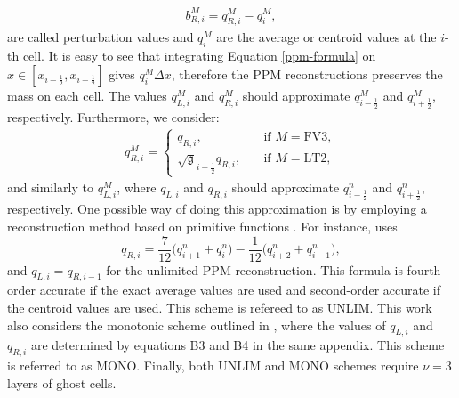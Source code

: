 \documentclass[preprint,12pt]{elsarticle}
\begin{document}
\begin{linenumbers}
\begin{align}
	b_{R,i}^M = q_{R,i}^M-{q_i^M},
\end{align}
are called perturbation values and ${q_i^M}$
are the average or centroid values at the $i$-th cell.
It is easy to see that integrating Equation \eqref{ppm-formula} on $x \in [x_{i-\frac{1}{2}},x_{i+\frac{1}{2}}]$ gives $q^M_i\Delta x$, therefore the PPM reconstructions preserves the mass on each cell.
The values $q_{L,i}^M$ and $q_{R,i}^M$ should approximate ${q_{i-\frac{1}{2}}^M}$ and ${q_{i+\frac{1}{2}}^M}$, respectively.
Furthermore, we consider:
\begin{align}
	\label{phi_L}
	q_{R,i}^M  =
	\begin{cases}
		q_{R,i},
		\quad &\text{if }{M=\text{FV3}},\\
		\sqrt{\mathfrak{g}}_{i+\frac{1}{2}} q_{R,i},
		\quad &\text{if }{M=\text{LT2}},
	\end{cases}
\end{align}
and similarly to $q_{L,i}^M$, where 
$q_{L,i}$ and $q_{R,i}$ should approximate ${q_{i-\frac{1}{2}}^n}$ and ${q_{i+\frac{1}{2}}^n}$, respectively.
One possible way of doing this approximation is by employing a reconstruction method based on primitive functions \cite[Chapter 17]{leveque:1990}.
For instance, \cite{colella:1984} uses
\begin{equation}
	\label{unlim-ppm}
	q_{R,i} = \frac{7}{12} \bigg( q_{i+1}^n + q_{i}^n \bigg) - \frac{1}{12} \bigg(q_{i+2}^n +q_{i-1}^n\bigg),
\end{equation}
and $q_{L,i}=q_{R,i-1}$ for the unlimited PPM reconstruction.
This formula is fourth-order accurate if the exact average values are used and second-order accurate if the centroid values are used.
This scheme is refereed to as UNLIM.
This work also considers the monotonic scheme outlined in \cite[Appendix B]{lin:2004}, where the values of $q_{L,i}$ and $q_{R,i}$ are determined by equations B3 and B4 in the same appendix.
This scheme is referred to as MONO.
Finally, both UNLIM and MONO schemes require $\nu=3$ layers of ghost cells.


\end{linenumbers}
\end{document}
